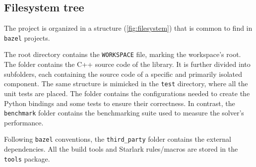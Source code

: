 \subsection*{Filesystem tree}

The project is organized in a structure (\autoref{fig:filesystem}) that is common to find in \texttt{bazel} projects.

The root directory contains the \texttt{WORKSPACE} file, marking the workspace's root.
The \dlinear folder contains the C++ source code of the library.
It is further divided into subfolders, each containing the source code of a specific and primarily isolated component.
The same structure is mimicked in the \texttt{test} directory, where all the unit tests are placed.
The \pydlinear folder contains the configurations needed to create the Python bindings and some tests to ensure their correctness. In contrast, the \texttt{benchmark} folder contains the benchmarking suite used to measure the solver's performance.

Following \texttt{bazel} conventions, the \texttt{third\_party} folder contains the external dependencies.
All the build tools and Starlark rules/macros are stored in the \texttt{tools} package.


